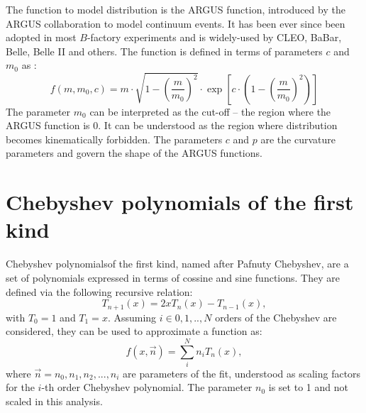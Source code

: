 The function to model \epem\ra\qqbar distribution is the ARGUS function, introduced by the ARGUS collaboration to model continuum events.
It has been ever since been adopted in most $B$-factory experiments and is widely-used by CLEO, BaBar, Belle, Belle II and others.
The function is defined in terms of parameters $c$ and $m_0$ as \cite{ARGUS:1990hfq}:
\begin{equation}\label{eq:argus_function}
    f(m, m_0, c) = m \cdot \sqrt{ 1 - \left( \frac{m}{m_0} \right)^2}
    \cdot \exp\left[ c \cdot \left(1 - \left(\frac{m}{m_0}\right)^2 \right) \right]
\end{equation}
The parameter $m_0$ can be interpreted as the cut-off -- the region where the ARGUS function is 0.
It can be understood as the region where \Mbc distribution becomes kinematically forbidden.
The parameters $c$ and $p$ are the curvature parameters and govern the shape of the ARGUS functions.

\section{Chebyshev polynomials of the first kind}
Chebyshev polynomialsof the first kind, named after Pafnuty Chebyshev, are a set of polynomials expressed in terms of cossine and sine functions.
They are defined via the following recursive relation:
\begin{equation}\label{eq:chebyshev_generator}
    T_{n+1}(x) = 2xT_n(x) - T_{n-1}(x),
\end{equation}
with $T_0=1$ and $T_1=x$.
Assuming $i\in{0,1,.., N}$ orders of the Chebyshev are considered, they can be used to approximate a function as:
\begin{equation}\label{eq:chebyshev_pdf}
    f(x, \vec{n}) = \sum_i^N n_i T_n(x),
\end{equation}
where $\vec{n}={n_0,n_1,n_2,...,n_i}$ are parameters of the fit, understood as scaling factors for the $i$-th order Chebyshev polynomial.
The parameter $n_0$ is set to 1 and not scaled in this analysis. 